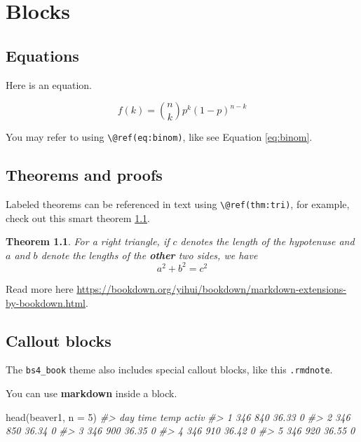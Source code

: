 \documentclass[
  oneside]{book}
\newenvironment{Shaded}{\begin{snugshade}}{\end{snugshade}}
\newcommand{\AttributeTok}[1]{\textcolor[rgb]{0.77,0.63,0.00}{#1}}
\newcommand{\CommentTok}[1]{\textcolor[rgb]{0.56,0.35,0.01}{\textit{#1}}}
\newcommand{\DecValTok}[1]{\textcolor[rgb]{0.00,0.00,0.81}{#1}}
\newcommand{\FunctionTok}[1]{\textcolor[rgb]{0.00,0.00,0.00}{#1}}
\newcommand{\NormalTok}[1]{#1}
\newtheorem{theorem}{Theorem}[chapter]
\theoremstyle{definition}
\theoremstyle{definition}
\theoremstyle{definition}
\theoremstyle{definition}
\theoremstyle{remark}
\begin{document}
\hypertarget{blocks}{%
\chapter{Blocks}\label{blocks}}

\hypertarget{equations}{%
\section{Equations}\label{equations}}

Here is an equation.

\begin{equation} 
  f\left(k\right) = \binom{n}{k} p^k\left(1-p\right)^{n-k}
  \label{eq:binom}
\end{equation}

You may refer to using \texttt{\textbackslash{}@ref(eq:binom)}, like see Equation \eqref{eq:binom}.

\hypertarget{theorems-and-proofs}{%
\section{Theorems and proofs}\label{theorems-and-proofs}}

Labeled theorems can be referenced in text using \texttt{\textbackslash{}@ref(thm:tri)}, for example, check out this smart theorem \ref{thm:tri}.

\begin{theorem}
\protect\hypertarget{thm:tri}{}\label{thm:tri}For a right triangle, if \(c\) denotes the \emph{length} of the hypotenuse and \(a\) and \(b\) denote the lengths of the \textbf{other} two sides, we have \[a^2 + b^2 = c^2\]
\end{theorem}

Read more here \url{https://bookdown.org/yihui/bookdown/markdown-extensions-by-bookdown.html}.

\hypertarget{callout-blocks}{%
\section{Callout blocks}\label{callout-blocks}}

The \texttt{bs4\_book} theme also includes special callout blocks, like this \texttt{.rmdnote}.

You can use \textbf{markdown} inside a block.

\begin{Shaded}
\begin{Highlighting}[]
\FunctionTok{head}\NormalTok{(beaver1, }\AttributeTok{n =} \DecValTok{5}\NormalTok{)}
\CommentTok{\#\textgreater{}   day time  temp activ}
\CommentTok{\#\textgreater{} 1 346  840 36.33     0}
\CommentTok{\#\textgreater{} 2 346  850 36.34     0}
\CommentTok{\#\textgreater{} 3 346  900 36.35     0}
\CommentTok{\#\textgreater{} 4 346  910 36.42     0}
\CommentTok{\#\textgreater{} 5 346  920 36.55     0}
\end{Highlighting}
\end{Shaded}
\end{document}
